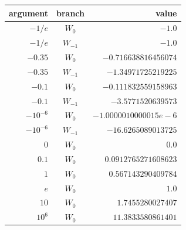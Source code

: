 \begin{tabular}{@{}rcr@{}}
\toprule
argument & branch & value \\
\midrule
$-1/e$ & $W_0$ & $-1.0$ \\
$-1/e$ & $W_{-1}$ & $-1.0$ \\
$-0.35$ & $W_0$ & $-0.716638816456074$ \\
$-0.35$ & $W_{-1}$ & $-1.34971725219225$ \\
$-0.1$ & $W_0$ & $-0.111832559158963$ \\
$-0.1$ & $W_{-1}$ & $-3.5771520639573$ \\
$-10^{-6}$ & $W_0$ & $-1.0000010000015e-6$ \\
$-10^{-6}$ & $W_{-1}$ & $-16.6265089013725$ \\
$0$ & $W_0$ & $0.0$ \\
$0.1$ & $W_0$ & $0.0912765271608623$ \\
$1$ & $W_0$ & $0.567143290409784$ \\
$e$ & $W_0$ & $1.0$ \\
$10$ & $W_0$ & $1.7455280027407$ \\
$10^6$ & $W_0$ & $11.3833580861401$ \\
\bottomrule
\end{tabular}
